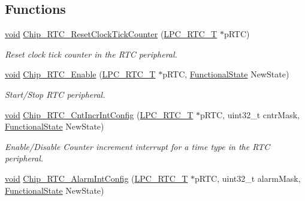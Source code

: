 \subsection*{Functions}
\begin{DoxyCompactItemize}
\item 
\hyperlink{Paradigm_2Tern__EE_2small_2portmacro_8h_a14d32f8130d3c0b212cfc751730b5b49}{void} \hyperlink{group__RTC__17XX__40XX_ga1d569e8d5d570f6c79d2d1f803bb5f7c}{Chip\-\_\-\-R\-T\-C\-\_\-\-Reset\-Clock\-Tick\-Counter} (\hyperlink{structLPC__RTC__T}{L\-P\-C\-\_\-\-R\-T\-C\-\_\-\-T} $\ast$p\-R\-T\-C)
\begin{DoxyCompactList}\small\item\em Reset clock tick counter in the R\-T\-C peripheral. \end{DoxyCompactList}\item 
\hyperlink{Paradigm_2Tern__EE_2small_2portmacro_8h_a14d32f8130d3c0b212cfc751730b5b49}{void} \hyperlink{group__RTC__17XX__40XX_gaad05032c6d6c4bc5ea9e02311cdc9a18}{Chip\-\_\-\-R\-T\-C\-\_\-\-Enable} (\hyperlink{structLPC__RTC__T}{L\-P\-C\-\_\-\-R\-T\-C\-\_\-\-T} $\ast$p\-R\-T\-C, \hyperlink{group__LPC__Types__Public__Types_gac9a7e9a35d2513ec15c3b537aaa4fba1}{Functional\-State} New\-State)
\begin{DoxyCompactList}\small\item\em Start/\-Stop R\-T\-C peripheral. \end{DoxyCompactList}\item 
\hyperlink{Paradigm_2Tern__EE_2small_2portmacro_8h_a14d32f8130d3c0b212cfc751730b5b49}{void} \hyperlink{group__RTC__17XX__40XX_gaddaf7559a23df0704358128234fcb214}{Chip\-\_\-\-R\-T\-C\-\_\-\-Cnt\-Incr\-Int\-Config} (\hyperlink{structLPC__RTC__T}{L\-P\-C\-\_\-\-R\-T\-C\-\_\-\-T} $\ast$p\-R\-T\-C, uint32\-\_\-t cntr\-Mask, \hyperlink{group__LPC__Types__Public__Types_gac9a7e9a35d2513ec15c3b537aaa4fba1}{Functional\-State} New\-State)
\begin{DoxyCompactList}\small\item\em Enable/\-Disable Counter increment interrupt for a time type in the R\-T\-C peripheral. \end{DoxyCompactList}\item 
\hyperlink{Paradigm_2Tern__EE_2small_2portmacro_8h_a14d32f8130d3c0b212cfc751730b5b49}{void} \hyperlink{group__RTC__17XX__40XX_ga2ecd6a555d1a1977a80a30ca21645ca4}{Chip\-\_\-\-R\-T\-C\-\_\-\-Alarm\-Int\-Config} (\hyperlink{structLPC__RTC__T}{L\-P\-C\-\_\-\-R\-T\-C\-\_\-\-T} $\ast$p\-R\-T\-C, uint32\-\_\-t alarm\-Mask, \hyperlink{group__LPC__Types__Public__Types_gac9a7e9a35d2513ec15c3b537aaa4fba1}{Functional\-State} New\-State)

\end{DoxyCompactItemize}
